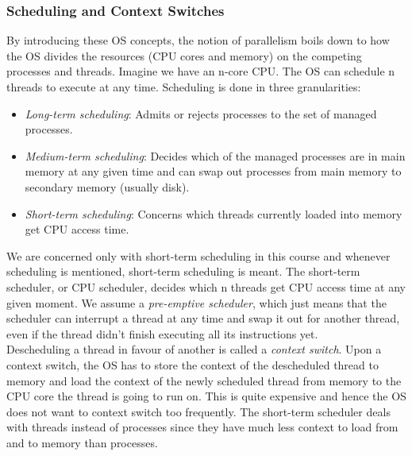 \documentclass[main]{subfiles}
\begin{document}
\subsubsection{Scheduling and Context Switches}
By introducing these OS concepts, the notion of parallelism boils down to how the OS divides the resources (CPU cores and memory) on the competing processes and threads. Imagine we have an n-core CPU. The OS can schedule n threads to execute at any time. Scheduling is done in three granularities:
\begin{itemize}
    \item \textit{Long-term scheduling}: Admits or rejects processes to the set of managed processes.
    \item \textit{Medium-term scheduling}: Decides which of the managed processes are in main memory at any given time and can swap out processes from main memory to secondary memory (usually disk).
    \item \textit{Short-term scheduling}: Concerns which threads currently loaded into memory get CPU access time.
\end{itemize}
We are concerned only with short-term scheduling in this course and whenever scheduling is mentioned, short-term scheduling is meant. The short-term scheduler, or CPU scheduler, decides which n threads get CPU access time at any given moment. We assume a \textit{pre-emptive scheduler}, which just means that the scheduler can interrupt a thread at any time and swap it out for another thread, even if the thread didn't finish executing all its instructions yet.\\
Descheduling a thread in favour of another is called a \textit{context switch}. Upon a context switch, the OS has to store the context of the descheduled thread to memory and load the context of the newly scheduled thread from memory to the CPU core the thread is going to run on. This is quite expensive and hence the OS does not want to context switch too frequently. The short-term scheduler deals with threads instead of processes since they have much less context to load from and to memory than processes.
\end{document}

